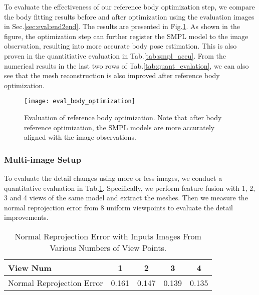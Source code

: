 To evaluate the effectiveness of our reference body optimization step, we compare the body fitting results before and after optimization using the evaluation images in Sec.\ref{sec:eval:end2end}. The results are presented in Fig.\ref{fig:eval_body_optimization}. As shown in the figure, the optimization step can further register the SMPL model to the image observation, resulting into more accurate body pose estimation. This is also proven in the quantitiative evaluation in Tab.\ref{tab:smpl_accu}.  From the numerical results in the last two rows of Tab.\ref{tab:quant_evalation}, we can also see that the mesh reconstruction is also improved after reference body optimization. 


\begin{figure}
	\begin{center}
		\texttt{[image: eval\_body\_optimization]}
	\end{center}
	\caption{Evaluation of reference body optimization. Note that after body reference optimization, the SMPL models are more accurately aligned with the image observations. }
	\label{fig:eval_body_optimization}
\end{figure}


\subsubsection{Multi-image Setup}
To evaluate the detail changes using more or less images, we conduct a quantitative evaluation in Tab.\ref{tab:normal_improvement}. Specifically, we perform feature fusion with 1, 2, 3 and 4 views of the same model and extract the meshes. Then we measure the normal reprojection error\cite{pifuSHNMKL19} from 8 uniform viewpoints to evaluate the detail improvements. 

\begin{table}
    \centering
    \caption{Normal Reprojection Error with Inputs Images From Various Numbers of View Points. }
    \label{tab:normal_improvement}
    \begin{tabular}{lcccc}
        \toprule
         View Num & 1 & 2 & 3 & 4   \\
         \midrule
         Normal Reprojection Error & 0.161 & 0.147 & 0.139 & 0.135 \\
         \bottomrule
    \end{tabular}
 \end{table}






